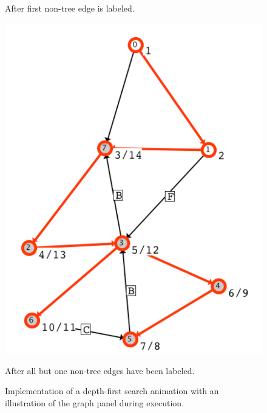 \begin{figure}
\begin{minipage}{0.49\textwidth}
After first non-tree edge is labeled. 

\medskip

\includegraphics[scale=0.5]{X_dfs_d_2}

After all but one non-tree edges have been labeled.

\end{minipage}
\caption{Implementation of a depth-first search animation
  with an illustration of the graph panel during execution.}
\label{fig:dfs}
\end{figure}
